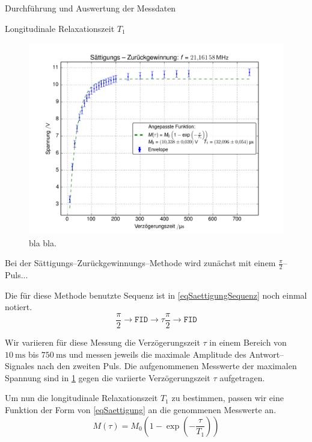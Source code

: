 \documentclass[pdftex, a4paper,11pt, twoside, ngerman]{report}
\begin{document}
\begin{chapter}{Durchführung und Auswertung der Messdaten}
\begin{section}{
        Longitudinale Relaxationszeit $T_{1}$}
\begin{subsection}
        \begin{figure}[b!]
          \centering
          \includegraphics[width=.9\textwidth]
          {Figures/SaettigungsZurueckgewinnung.png}
          \caption{bla bla.}
          \label{figSaettigung}
        \end{figure}
        
        Bei der Sättigungs--Zurückgewinnungs--Methode wird zunächst mit einem
        $\frac{\pi}{2}$--Puls...
        
        
        Die für diese Methode benutzte Sequenz ist in \cref{eqSaettigungSequenz}
        noch einmal notiert.
        \begin{equation}
          \label{eqSaettigungSequenz}
          \frac{\pi}{2} \rightarrow \mathtt{FID} \rightarrow
          \tau \frac{\pi}{2} \rightarrow \mathtt{FID}
        \end{equation}
        
        Wir variieren für diese Messung die Verzögerungszeit $\tau$ in einem
        Bereich von $\SI{10}{\milli\second}$ bis $\SI{750}{\milli\second}$
        und messen jeweils die maximale Amplitude des Antwort--Signales nach
        den zweiten Puls.
        Die aufgenommenen Messwerte der maximalen Spannung sind in
        \cref{figSaettigung} gegen die variierte Verzögerungszeit $\tau$
        aufgetragen.
        
        Um nun die longitudinale Relaxationszeit $T_{1}$ zu bestimmen,
        passen wir eine Funktion der Form von \cref{eqSaettigung} an die
        genommenen Messwerte an.
        \begin{equation}
          \label{eqSaettigung}
          M(\tau)=M_{0}\left(1-\exp\left(-\frac{\tau}{T_{1}}\right)\right)
        \end{equation}
        

\end{subsection}
\end{section}
\end{chapter}
\end{document}
